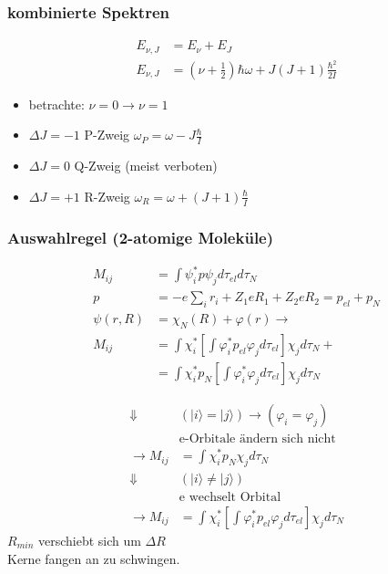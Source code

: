 \subsubsection*{kombinierte Spektren}

\begin{equation*}
    \begin{aligned}
        E_{\nu, J} &= E_\nu + E_J \\
        E_{\nu, J} &= \left(\nu + \frac{1}{2}\right) \hbar \omega + J(J+1) \frac{\hbar^2}{2I}
    \end{aligned}
\end{equation*}

\begin{itemize}
    \itemsep 0pt
    \item betrachte: $\nu = 0 \rightarrow \nu = 1$
    \item $\Delta J = -1$ P-Zweig $\omega_P = \omega - J \frac{\hbar}{I}$
    \item $\Delta J = 0$ Q-Zweig (meist verboten)
    \item $\Delta J = +1$ R-Zweig $\omega_R = \omega + (J+1)\frac{\hbar}{I}$
\end{itemize}

\subsubsection*{Auswahlregel (2-atomige Moleküle)}

\begin{equation*}
    \begin{aligned}
        M_{ij} &= \int \psi_i^* p \psi_j d\tau_{el} d\tau_N \\
        p &= -e \sum_i r_i + Z_1 eR_1 + Z_2 e R_2 = p_{el} + p_N \\
        \psi(r,R) &= \chi_N(R) + \varphi(r) \rightarrow \\
        M_{ij} &= \int \chi_i^* \left[\int \varphi_i^* p_{el} \varphi_j d\tau_{el}\right] \chi_j d\tau_{N} + \\
                &= \int \chi_i^* p_N \left[\int \varphi_i^* \varphi_j d\tau_{el}\right] \chi_j d\tau_{N}
    \end{aligned}
\end{equation*}

\begin{equation*}
    \begin{aligned}
        \Downarrow \quad &(|i\rangle = |j\rangle) \rightarrow (\varphi_i = \varphi_j) \\
        &\text{e-Orbitale ändern sich nicht} \\
        \rightarrow M_{ij} &= \int \chi_i^* p_N \chi_j d\tau_N \\
        \Downarrow \quad &(|i\rangle \neq |j\rangle) \\
        &\text{e wechselt Orbital} \\
        \rightarrow M_{ij} &= \int \chi_i^* \left[\int \varphi_i^* p_{el} \varphi_j d\tau_{el}\right] \chi_j d\tau_{N}
    \end{aligned}
\end{equation*}
$R_{min}$ verschiebt sich um $\Delta R$ \\
Kerne fangen an zu schwingen.